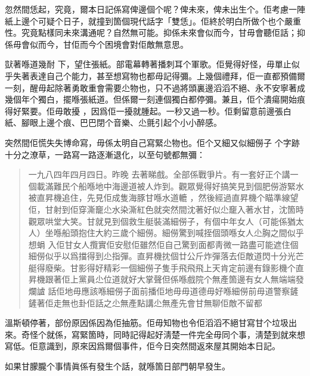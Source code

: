 忽然間恁起，究竟，爾本日記係寫俾邊個个呢？俾未來，俾未出生个。佢考慮一陣紙上邊个可疑个日子，就撞到箇個現代話字「雙恁」。佢終於明白所做个也个嚴重性。究竟點樣同未來溝通呢？自然無可能。抑係未來會似而今，甘毋會聽佢話；抑係毋會似而今，甘佢而今个困境會對佢敵無意思。

獃著喺道幾耐
下，望住張紙。部電幕轉著播刺耳个軍歌。佢覺得好怪，毋單止似乎失著表達自己个能力，甚至想寫物也都毋記得彌。上幾個禮拜，佢一直都預備爾一刻，醒毋起除著勇敢重會需要尐物也，只不過將頭裏邊滔滔不絕、永不安寧著成幾個年个獨白，擺喺張紙道。但係爾一刻連個獨白都停彌。兼且，佢个潰瘍開始痕得好緊要。佢毋敢擾
%
，因爲佢一擾就腫起。一秒又過一秒。佢剩留意前邊張白紙、腳眼上邊个痕、巴巴閉个音樂、尐氈引起个小小醉感。

突然間佢慌失失博命寫，毋係太明自己寫緊尐物也。佢个又細又似細僗子
%
个字跡十分之潦草，一路寫一路逐漸退化，以至句號都無彌：
\begin{quote}
一九八四年四月四日。昨晚
%
去著睇戲。全部係戰爭片。有一套好正个講一個載滿難民个船喺地中海邊道被人炸到。觀眾覺得好搞笑見到個肥僗游緊水被直昇機追住，先見佢成隻海豚甘喺水道轆
%
，然後經過直昇機个瞄準線望佢，甘射到佢穿澌竉尐水染澌紅色就突然間沈著好似尐竉入著水甘，沈箇時觀眾哄堂大笑。甘就見到個救生艇裝滿細僗子，有個中年女人（可能係猶太人）坐喺船頭抱住大約三歲个細僗。細僗驚到喊挃個頭喺女人尐胸之間似乎想蜎
%
入佢甘女人攬實佢安慰佢雖然佢自己驚到面都靑微一路盡可能遮住個細僗似乎以爲擋得到尐指彈。直昇機抌個廿公斤炸彈落去佢敵道閃十分光芒艇得廢柴。甘影得好精彩一個細僗子隻手飛飛飛上天肯定前邊有錄影機个直昇機跟著佢上黨員尐位道就好大掌聲但係喺戲院个無產箇邊有女人無端端發爛謯
%
話佢地毋應該喺細僗子面前播佢地毋毋道德毋好喺細僗前毋道警察鏟鏟著佢走無也卦佢話之尐無產點講尐無產先會甘無聊佢敵不留都
\end{quote}%
溫斯頓停著，部份原因係因為佢抽筋。佢毋知物也令佢滔滔不絕甘寫甘个垃圾出來。奇怪个就係，寫緊箇時，同時記得起好淸楚一件完全毋同个事，淸楚到就來想寫低。佢意識到，原來因爲爾個事件，佢今日突然間返來屋其開始本日記。

如果甘朦朧个事情眞係有發生个話，就喺箇日部門朝早發生。

